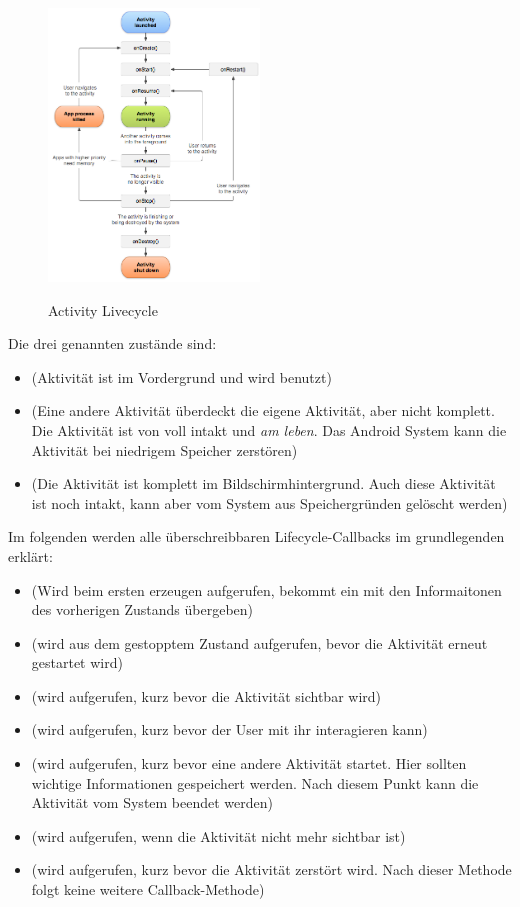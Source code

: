 \begin{figure}[h]
	\centering
	\includegraphics[width=0.5\textwidth]{resources/android/lifecycle}
	\caption{Activity Livecycle}
	\cite{lifecycle}
\end{figure}
Die drei genannten zustände sind:
\begin{itemize}
	\item {} (Aktivität ist im Vordergrund und wird benutzt)
	\item {} (Eine andere Aktivität überdeckt die eigene Aktivität, aber 
nicht komplett. Die Aktivität ist von voll intakt und \emph{am leben}. Das 
Android System kann die Aktivität bei niedrigem Speicher zerstören)
	\item {} (Die Aktivität ist komplett im Bildschirmhintergrund. Auch 
diese Aktivität ist noch intakt, kann aber vom System aus Speichergründen 
gelöscht werden)



	
\end{itemize}
Im folgenden werden alle überschreibbaren Lifecycle-Callbacks im grundlegenden erklärt:
\begin{itemize}
	\item {} (Wird beim ersten erzeugen aufgerufen, bekommt ein  mit den Informaitonen des vorherigen Zustands übergeben)
	\item {} (wird aus dem gestopptem Zustand aufgerufen, bevor die Aktivität erneut gestartet wird)
	\item {} (wird aufgerufen, kurz bevor die Aktivität sichtbar wird)
	\item {} (wird aufgerufen, kurz bevor der User mit ihr interagieren kann)
	\item {} (wird aufgerufen, kurz bevor eine andere Aktivität startet. Hier sollten wichtige Informationen gespeichert werden. Nach diesem Punkt kann die Aktivität vom System beendet werden)
	\item {} (wird aufgerufen, wenn die Aktivität nicht mehr sichtbar ist)
	\item {} (wird aufgerufen, kurz bevor die Aktivität zerstört wird. Nach dieser Methode folgt keine weitere Callback-Methode)
\end{itemize}
